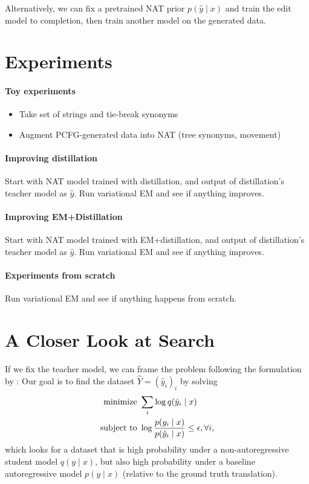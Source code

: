 \documentclass[11pt]{article}
\begin{document}
Alternatively, we can fix a pretrained NAT prior $p(\hat{y}\mid x)$ and
train the edit model to completion, then train another model on the generated data.

\section{Experiments}
\paragraph{Toy experiments}
\begin{itemize}
\item Take set of strings and tie-break synonyms
\item Augment PCFG-generated data into NAT (tree synonyms, movement)
\end{itemize}

\paragraph{Improving distillation}
Start with NAT model trained with distillation,
and output of distillation's teacher model as $\hat{y}$.
Run variational EM and see if anything improves.

\paragraph{Improving EM+Distillation}
Start with NAT model trained with EM+distillation,
and output of distillation's teacher model as $\hat{y}$.
Run variational EM and see if anything improves.

\paragraph{Experiments from scratch}
Run variational EM and see if anything happens from scratch.

\section{A Closer Look at Search}
If we fix the teacher model, we can frame the problem following the formulation by \citet{emnat}:
Our goal is to find the dataset $\hat{Y} = (\hat{y}_i)_i$ by solving
\begin{equation}
    \begin{aligned}
    \textnormal{minimize }& \sum_i \log q(\hat{y}_i \mid x)\\
    \textnormal{subject to } & \log\frac{p(y_i \mid x)}{p(\hat{y}_i \mid x)} \le \epsilon, \forall i,
    \end{aligned}
\end{equation}
which looks for a dataset that is high probability under a non-autoregressive student model
$q(y \mid x)$, but also high probability under a baseline autoregressive model $p(y \mid x)$
(relative to the ground truth translation).
\end{document}

